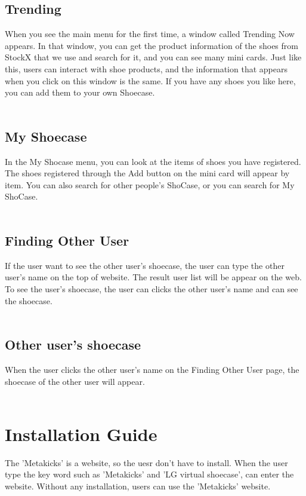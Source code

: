 \documentclass[conference]{IEEEtran}
\begin{document}
\begin{enumerate}
\subsection{Trending}
When you see the main menu for the first time, a window called Trending Now appears. In that window, you can get the product information of the shoes from StockX that we use and search for it, and you can see many mini cards. Just like this, users can interact with shoe products, and the information that appears when you click on this window is the same. If you have any shoes you like here, you can add them to your own Shoecase.\\\\
\subsection{My Shoecase}
In the My Shocase menu, you can look at the items of shoes you have registered. The shoes registered through the Add button on the mini card will appear by item. You can also search for other people's ShoCase, or you can search for My ShoCase.\\\\
\subsection{Finding Other User}
If the user want to see the other user's shoecase, the user can type the other user's name on the top of website. The result user list will be appear on the web. To see the user's shoecase, the user can clicks the other user's name and can see the shoecase.\\\\
\subsection{Other user's shoecase}
When the user clicks the other user's name on the Finding Other User page, the shoecase of the other user will appear.\\\\
\end{enumerate}
\section{Installation Guide}
The 'Metakicks' is a website, so the uesr don't have to install. When the user type the key word such as 'Metakicks' and 'LG virtual shoecase', can enter the website. Without any installation, users can use the 'Metakicks' website.\\\\
\end{document}
